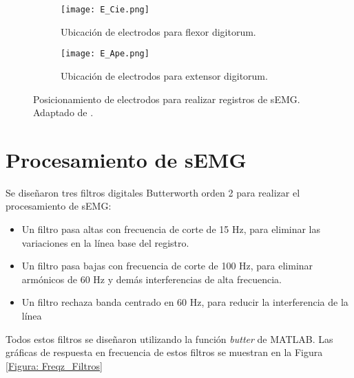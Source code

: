\begin{figure}[htbp]
	\centering
	\begin{subfigure}[htbp]{0.3\textwidth}
		\texttt{[image: E\_Cie.png]}
		\caption{Ubicación de electrodos para flexor digitorum.}
		\label{Figura: E_Cie}
	\end{subfigure}
	\hspace{3cm}
	\begin{subfigure}[htbp]{0.3\textwidth}
		\texttt{[image: E\_Ape.png]}
		\caption{Ubicación de electrodos para extensor digitorum.}
		\label{Figura: E_Ape}
	\end{subfigure}
	\caption[Posicionamiento de electrodos para registro de sEMG]{Posicionamiento de electrodos para realizar registros de sEMG. Adaptado de \cite{Cavalcanti-Garcia2009}.}
	\label{Figura: E_sEMG}
\end{figure}


\section{Procesamiento de sEMG} \label{Sec: Procesamiento}
Se diseñaron tres filtros digitales Butterworth orden 2 para realizar el procesamiento de sEMG:

\begin{itemize}
	\item Un filtro pasa altas con frecuencia de corte de 15 Hz, para eliminar las variaciones en la línea base del registro.
	\item Un filtro pasa bajas con frecuencia de corte de 100 Hz, para eliminar armónicos de 60 Hz y demás interferencias de alta frecuencia.
	\item Un filtro rechaza banda centrado en 60 Hz, para reducir la interferencia de la línea
\end{itemize}

Todos estos filtros se diseñaron utilizando la función \emph{butter} de MATLAB\textregistered. Las gráficas de respuesta en frecuencia de estos filtros se muestran en la Figura \ref{Figura: Freqz_Filtros} %

